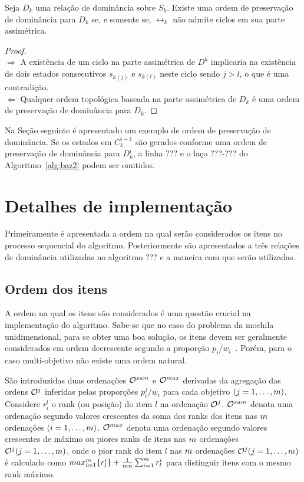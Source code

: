 \begin{myprop}
  Seja $D_k$ uma relação de dominância sobre $S_k$.
  Existe uma ordem de preservação de dominância para $D_k$ se, e somente se,
  $\rel_k$ não admite ciclos em sua parte assimétrica.
  \label{prop:domorder}
\end{myprop}

\begin{proof}
  \noindent \\ $\Rightarrow$ A existência de um ciclo na parte assimétrica de $D^k$
  implicaria na existência de dois estados consecutivos $s_{k(j)}$ e $s_{k(l)}$
  neste ciclo sendo $j > l$, o que é uma contradição.\\
  $\Leftarrow$ Qualquer ordem topológica baseada na parte assimétrica de $D_k$
  é uma ordem de preservação de dominância para $D_k$.
  \qedhere
\end{proof}

Na Seção seguinte é apresentado um exemplo de ordem de preservação de dominância.
Se os estados em $C_k^{i-1}$ são gerados conforme uma ordem de preservação de
dominância para $D_k^i$, a linha ??? e o laço ???-??? do Algoritmo~\ref{alg:baz2}
podem ser omitidos.

\section{Detalhes de implementação}

Primeiramente é apresentada a ordem na qual serão considerados os itens no
processo sequencial do algoritmo.
Posteriormente são apresentados a três relações de dominância utilizadas
no algoritmo ??? e a maneira com que serão utilizadas.

\subsection{Ordem dos itens}

A ordem na qual os itens são considerados é uma questão crucial na implementação
do algoritmo.
Sabe-se que no caso do problema da mochila unidimensional, para se
obter uma boa solução, os itens devem ser geralmente considerados em
ordem decrescente segundo a proporção
$p_i/w_i$~\cite{ehrgott2013multicriteria, martello1990knapsack}.
Porém, para o caso multi-objetivo não existe uma ordem natural.

São introduzidas duas ordenações $\mathcal{O}^{sum}$ e $\mathcal{O}^{max}$
derivadas da agregação das ordens $\mathcal{O}^j$ inferidas pelas proporções
$p_i^j/w_i$ para cada objetivo $(j = 1, \ldots, m)$.
Considere $r_i^l$ o rank (ou posição) do item $l$ na ordenação $\mathcal{O}^j$.
$\mathcal{O}^{sum}$ denota uma ordenação segundo valores crescentes da soma dos
ranks dos itens nas $m$ ordenações $(i = 1, \ldots, m)$.
$\mathcal{O}^{max}$ denota uma ordenação segundo valores crescentes de máximo ou
piores ranks de itens nas $m$ ordenações $\mathcal{O}^j (j = 1, \ldots, m)$,
onde o pior rank do item $l$ nas $m$ ordenações $\mathcal{O}^j (j = 1, \ldots, m)$
é calculado como $max_{i=1}^{m}\{r_l^i\} + \frac{1}{m n} \sum_{i = 1}^{m} r_l^i$
para distinguir itens com o mesmo rank máximo.

